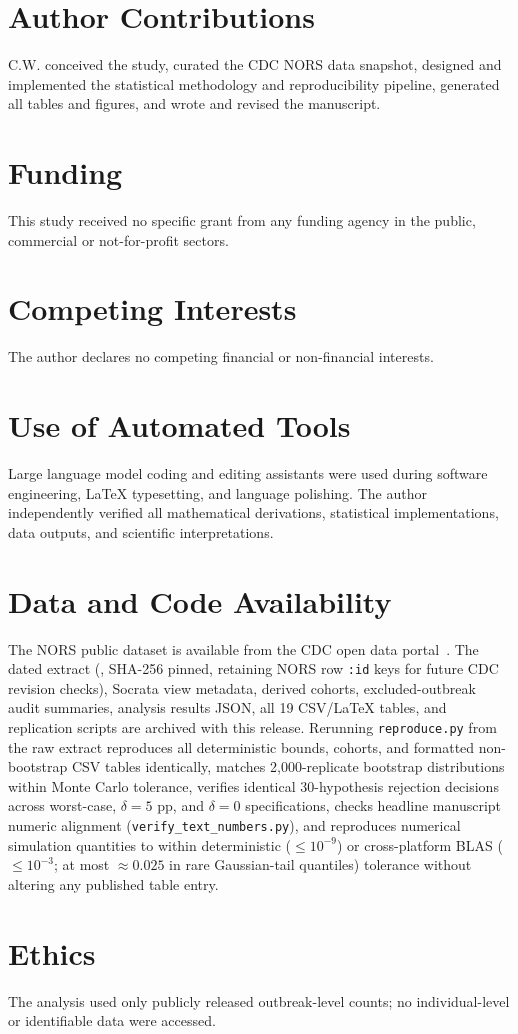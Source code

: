 \section*{Author Contributions}\label{sec:contributions}

C.W. conceived the study, curated the CDC NORS data snapshot, designed and implemented the statistical methodology and reproducibility pipeline, generated all tables and figures, and wrote and revised the manuscript.

\section*{Funding}\label{sec:funding}

This study received no specific grant from any funding agency in the public, commercial or not-for-profit sectors.

\section*{Competing Interests}\label{sec:competing}

The author declares no competing financial or non-financial interests.

\section*{Use of Automated Tools}\label{sec:ai}

Large language model coding and editing assistants were used during software engineering, LaTeX typesetting, and language polishing. The author independently verified all mathematical derivations, statistical implementations, data outputs, and scientific interpretations.

\section*{Data and Code Availability}\label{sec:availability}

The NORS public dataset is available from the CDC open data portal~\cite{cdc2024norsdata}. The dated extract (, SHA-256 pinned, retaining NORS row \texttt{:id} keys for future CDC revision checks), Socrata view metadata, derived cohorts, excluded-outbreak audit summaries, analysis results JSON, all 19 CSV/LaTeX tables, and replication scripts are archived with this release. Rerunning \texttt{reproduce.py} from the raw extract reproduces all deterministic bounds, cohorts, and formatted non-bootstrap CSV tables identically, matches 2,000-replicate bootstrap distributions within Monte Carlo tolerance, verifies identical 30-hypothesis rejection decisions across worst-case, $\delta=5\text{ pp}$, and $\delta=0$ specifications, checks headline manuscript numeric alignment (\texttt{verify\_text\_numbers.py}), and reproduces numerical simulation quantities to within deterministic ($\le 10^{-9}$) or cross-platform BLAS ($\le 10^{-3}$; at most $\approx 0.025$ in rare Gaussian-tail quantiles) tolerance without altering any published table entry.

\section*{Ethics}\label{sec:ethics}

The analysis used only publicly released outbreak-level counts; no individual-level or identifiable data were accessed.
